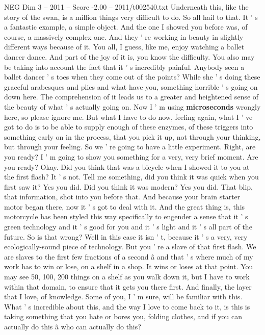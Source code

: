 \begin{textsample}{NEG Dim 3 – 2011 – Score -2.00 – 2011/t002540.txt}
Underneath this, like the story of the swan, is a million things very difficult to do.
So all hail to that.
It ' s a fantastic example, a simple object.
And the one I showed you before was, of course, a massively complex one.
And they ' re working in beauty in slightly different ways because of it.
You all, I guess, like me, enjoy watching a ballet dancer dance.
And part of the joy of it is, you know the difficulty.
You also may be taking into account the fact that it ' s incredibly painful.
Anybody seen a ballet dancer ' s toes when they come out of the points?
While she ' s doing these graceful arabesques and plies and what have you, something horrible ' s going on down here.
The comprehension of it leads us to a greater and heightened sense of the beauty of what ' s actually going on.
Now I ' m using \textbf{microseconds} wrongly here, so please ignore me.
But what I have to do now, feeling again, what I ' ve got to do is to be able to supply enough of these enzymes, of these triggers into something early on in the process, that you pick it up, not through your thinking, but through your feeling.
So we ' re going to have a little experiment.
Right, are you ready?
I ' m going to show you something for a very, very brief moment.
Are you ready?
Okay.
Did you think that was a bicycle when I showed it to you at the first flash?
It ' s not.
Tell me something, did you think it was quick when you first saw it?
Yes you did.
Did you think it was modern?
Yes you did.
That blip, that information, shot into you before that.
And because your brain starter motor began there, now it ' s got to deal with it.
And the great thing is, this motorcycle has been styled this way specifically to engender a sense that it ' s green technology and it ' s good for you and it ' s light and it ' s all part of the future.
So is that wrong?
Well in this case it isn ' t, because it ' s a very, very ecologically-sound piece of technology.
But you ' re a slave of that first flash.
We are slaves to the first few fractions of a second â and that ' s where much of my work has to win or lose, on a shelf in a shop.
It wins or loses at that point.
You may see 50, 100, 200 things on a shelf as you walk down it, but I have to work within that domain, to ensure that it gets you there first.
And finally, the layer that I love, of knowledge.
Some of you, I ' m sure, will be familiar with this.
What ' s incredible about this, and the way I love to come back to it, is this is taking something that you hate or bores you, folding clothes, and if you can actually do this â who can actually do this?

\end{textsample}
